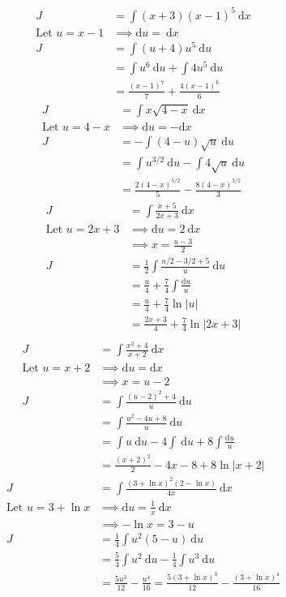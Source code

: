 \documentclass[a4paper,11pt]{article}
\theoremstyle{plain}
\theoremstyle{definition}
\begin{document}
\begin{align*}
	J&=\int (x+3){(x-1)}^5\ \text{d}x \\
	\text{Let } u = x-1 &\implies \text{d}u = \ \text{d}x \\
	J&=\int (u+4)u^5\ \text{d}u \\
	 &= \int u^6 \ \text{d}u + \int 4u^5\ \text{d}u \\
	 &= \frac{{(x-1)}^7}{7} + \frac{4{(x-1)}^6}{6}
\end{align*}
\begin{align*}
	J&=\int x \sqrt{4-x}\ \text{d}x \\
	\text{Let } u = 4-x &\implies \text{d}u = - \text{d}x \\
	J&= -\int (4-u)\sqrt{u}\ \text{d}u \\
	 &= \int u^{3/2}\ \text{d}u - \int 4\sqrt{u} \ \text{d}u \\
	 &= \frac{2{(4-x)}^{5/2}}{5} - \frac{8{(4-x)}^{3/2}}{3}
\end{align*}
\begin{align*}
	J&=\int \frac{x+5}{2x+3}\ \text{d}x \\
	\text{Let } u = 2x+3 &\implies \text{d}u = 2\ \text{d}x \\
						 &\implies x = \frac{u-3}{2} \\
	J&= \frac{1}{2}\int \frac{u/2-3/2+5}{u}\ \text{d}u \\
	 &= \frac{u}{4} + \frac{7}{4}\int \frac{\text{d}u}{u}  \\
	 &= \frac{u}{4} + \frac{7}{4}\ln |u|  \\
	 &= \frac{2x+3}{4} + \frac{7}{4}\ln |2x+3|  \\
\end{align*}
\begin{align*}
	J&=\int \frac{x^2+4}{x+2}\ \text{d}x \\
	\text{Let } u = x+2 &\implies \text{d}u = \text{d}x \\
						&\implies x = u-2 \\
	J&= \int \frac{{(u-2)}^2+4}{u}\ \text{d}u \\
	 &= \int \frac{u^2-4u+8}{u}\ \text{d}u \\
	 &= \int u\ \text{d}u -4 \int\ \text{d}u+8\int\frac{\text{d}u}{u} \\
	 &= \frac{{(x+2)}^2}{2} -4x-8+8 \ln \left|x+2\right|
\end{align*}
\begin{align*}
	J&=\int \frac{{(3 +\ln x)}^2(2-\ln x)}{4x}\ \text{d}x \\
	\text{Let } u = 3+\ln x &\implies \text{d}u =\frac{1}{x} \ \text{d}x \\
						&\implies -\ln x = 3-u \\
	J&= \frac{1}{4}\int u^2(5-u)\ \text{d}u \\
	 &= \frac{5}{4}\int u^2\ \text{d}u -\frac{1}{4}\int u^3\ \text{d}u \\
	 &= \frac{5u^3}{12}-\frac{u^4}{16} =\frac{5{(3+\ln x)}^3}{12}
										-\frac{{(3+\ln x)}^4}{16}
\end{align*}
\end{document}
